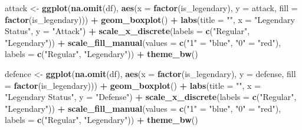 \documentclass[
]{article}
\newenvironment{Shaded}{\begin{snugshade}}{\end{snugshade}}
\newcommand{\AttributeTok}[1]{\textcolor[rgb]{0.13,0.29,0.53}{#1}}
\newcommand{\FunctionTok}[1]{\textcolor[rgb]{0.13,0.29,0.53}{\textbf{#1}}}
\newcommand{\NormalTok}[1]{#1}
\newcommand{\OtherTok}[1]{\textcolor[rgb]{0.56,0.35,0.01}{#1}}
\newcommand{\SpecialCharTok}[1]{\textcolor[rgb]{0.81,0.36,0.00}{\textbf{#1}}}
\newcommand{\StringTok}[1]{\textcolor[rgb]{0.31,0.60,0.02}{#1}}
\begin{document}
\begin{Shaded}
\begin{Highlighting}[]
\NormalTok{attack }\OtherTok{\textless{}{-}} \FunctionTok{ggplot}\NormalTok{(}\FunctionTok{na.omit}\NormalTok{(df), }\FunctionTok{aes}\NormalTok{(}\AttributeTok{x =} \FunctionTok{factor}\NormalTok{(is\_legendary), }\AttributeTok{y =}\NormalTok{ attack, }\AttributeTok{fill =} \FunctionTok{factor}\NormalTok{(is\_legendary))) }\SpecialCharTok{+}
  \FunctionTok{geom\_boxplot}\NormalTok{() }\SpecialCharTok{+}
  \FunctionTok{labs}\NormalTok{(}\AttributeTok{title =} \StringTok{""}\NormalTok{, }\AttributeTok{x =} \StringTok{"Legendary Status"}\NormalTok{, }\AttributeTok{y =} \StringTok{"Attack"}\NormalTok{) }\SpecialCharTok{+}
  \FunctionTok{scale\_x\_discrete}\NormalTok{(}\AttributeTok{labels =} \FunctionTok{c}\NormalTok{(}\StringTok{"Regular"}\NormalTok{, }\StringTok{"Legendary"}\NormalTok{)) }\SpecialCharTok{+}
  \FunctionTok{scale\_fill\_manual}\NormalTok{(}\AttributeTok{values =} \FunctionTok{c}\NormalTok{(}\StringTok{"1"} \OtherTok{=} \StringTok{"blue"}\NormalTok{, }\StringTok{"0"} \OtherTok{=} \StringTok{"red"}\NormalTok{), }\AttributeTok{labels =} \FunctionTok{c}\NormalTok{(}\StringTok{"Regular"}\NormalTok{, }\StringTok{"Legendary"}\NormalTok{)) }\SpecialCharTok{+}
  \FunctionTok{theme\_bw}\NormalTok{()}

\NormalTok{defence }\OtherTok{\textless{}{-}} \FunctionTok{ggplot}\NormalTok{(}\FunctionTok{na.omit}\NormalTok{(df), }\FunctionTok{aes}\NormalTok{(}\AttributeTok{x =} \FunctionTok{factor}\NormalTok{(is\_legendary), }\AttributeTok{y =}\NormalTok{ defense, }\AttributeTok{fill =} \FunctionTok{factor}\NormalTok{(is\_legendary))) }\SpecialCharTok{+}
  \FunctionTok{geom\_boxplot}\NormalTok{() }\SpecialCharTok{+}
  \FunctionTok{labs}\NormalTok{(}\AttributeTok{title =} \StringTok{""}\NormalTok{, }\AttributeTok{x =} \StringTok{"Legendary Status"}\NormalTok{, }\AttributeTok{y =} \StringTok{"Defense"}\NormalTok{) }\SpecialCharTok{+}
  \FunctionTok{scale\_x\_discrete}\NormalTok{(}\AttributeTok{labels =} \FunctionTok{c}\NormalTok{(}\StringTok{"Regular"}\NormalTok{, }\StringTok{"Legendary"}\NormalTok{)) }\SpecialCharTok{+}
  \FunctionTok{scale\_fill\_manual}\NormalTok{(}\AttributeTok{values =} \FunctionTok{c}\NormalTok{(}\StringTok{"1"} \OtherTok{=} \StringTok{"blue"}\NormalTok{, }\StringTok{"0"} \OtherTok{=} \StringTok{"red"}\NormalTok{), }\AttributeTok{labels =} \FunctionTok{c}\NormalTok{(}\StringTok{"Regular"}\NormalTok{, }\StringTok{"Legendary"}\NormalTok{)) }\SpecialCharTok{+}
  \FunctionTok{theme\_bw}\NormalTok{()}


\end{Highlighting}
\end{Shaded}
\end{document}
